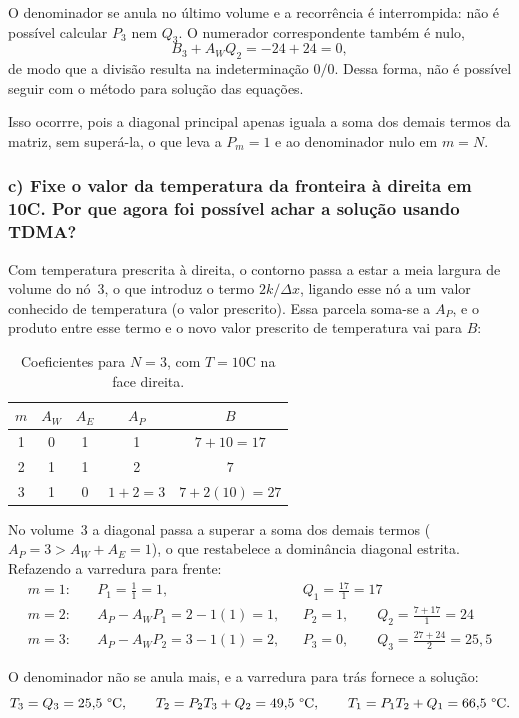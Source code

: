 O denominador se anula no último volume e a recorrência é interrompida: não é
possível calcular $P_3$ nem $Q_3$. O numerador correspondente também é nulo,
\[
  B_3+A_WQ_2=-24+24=0 ,
\]
de modo que a divisão resulta na indeterminação $0/0$. Dessa forma, não é possível seguir com o método para solução das equações.

Isso ocorrre, pois a diagonal principal apenas iguala a soma dos demais termos da matriz, sem superá-la,
o que leva a $P_m=1$ e ao denominador nulo em $m=N$.

\subsubsection*{c) Fixe o valor da temperatura da fronteira à direita em
10\textdegree C. Por que agora foi possível achar a solução usando TDMA?}

Com temperatura prescrita à direita, o contorno passa a estar a meia largura
de volume do nó~3, o que introduz o  termo $2k/\Delta x$, ligando esse
nó a um valor conhecido de temperatura (o valor prescrito). Essa parcela soma-se a $A_P$, e o produto entre esse termo e o novo valor prescrito de temperatura vai para $B$:

\begin{table}[H]
\centering
\caption{Coeficientes para $N=3$, com $T=10$\textdegree C na face direita.}
\begin{tabular}{ccccc}
\hline
$m$ & $A_W$ & $A_E$ & $A_P$ & $B$\\
\hline
1 & 0 & 1 & 1 & $7+10 = 17$\\
2 & 1 & 1 & 2 & $7$\\
3 & 1 & 0 & $1+2 = 3$ & $7 + 2(10) = 27$\\
\hline
\end{tabular}
\end{table}

No volume~3 a diagonal passa a superar a soma dos demais termos
($A_P=3 > A_W+A_E=1$), o que restabelece a dominância diagonal estrita.
Refazendo a varredura para frente:
\[
\begin{aligned}
  m=1:&\quad P_1=\frac{1}{1}=1, &&Q_1=\frac{17}{1}=17\\[4pt]
  m=2:&\quad A_P-A_WP_1=2-1(1)=1, &&P_2=1,\qquad Q_2=\frac{7+17}{1}=24\\[4pt]
  m=3:&\quad A_P-A_WP_2=3-1(1)=2, &&P_3=0,\qquad Q_3=\frac{27+24}{2}=25{,}5
\end{aligned}
\]

O denominador não se anula mais, e a varredura para trás fornece a solução:
\[
  T_3=Q_3=25{,}5\ \text{\textdegree C},\qquad
  T_2=P_2T_3+Q_2=49{,}5\ \text{\textdegree C},\qquad
  T_1=P_1T_2+Q_1=66{,}5\ \text{\textdegree C}.
\]

